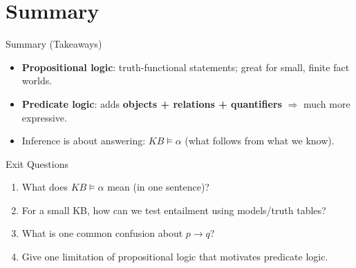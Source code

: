 \documentclass[aspectratio=169]{beamer}
\begin{document}
\section{Summary}
\label{sec:summary}

\begin{frame}{Summary (Takeaways)}
  \begin{itemize}[<+->]
    \item \textbf{Propositional logic}: truth-functional statements; great for small, finite fact worlds.
    \item \textbf{Predicate logic}: adds \textbf{objects + relations + quantifiers} $\Rightarrow$ much more expressive.
    \item Inference is about answering: $KB \models \alpha$ (what follows from what we know).
  \end{itemize}
\end{frame}

\begin{frame}{Exit Questions}
  \begin{enumerate}[<+->]
    \item What does $KB \models \alpha$ mean (in one sentence)?
    \item For a small KB, how can we test entailment using models/truth tables?
    \item What is one common confusion about $p \rightarrow q$?
    \item Give one limitation of propositional logic that motivates predicate logic.
  \end{enumerate}
  \slidesources{\AIMLUnitIISources}
\end{frame}

\UPESThankYouFrame
\end{document}
